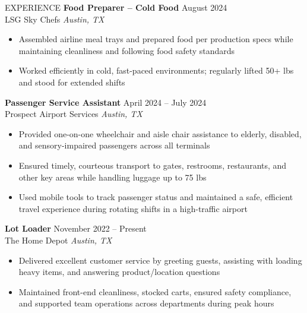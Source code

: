 \documentclass{resume} %
\begin{document}
\begin{rSection}{EXPERIENCE}
    \textbf{Food Preparer – Cold Food} \hfill August 2024 \\
    LSG Sky Chefs \hfill \textit{Austin, TX}
    \begin{itemize}
        \itemsep -3pt {} 
        \item Assembled airline meal trays and prepared food per production specs while maintaining cleanliness and following food safety standards
        \item Worked efficiently in cold, fast-paced environments; regularly lifted 50+ lbs and stood for extended shifts
    \end{itemize}
    
    \textbf{Passenger Service Assistant} \hfill April 2024 – July 2024 \\
    Prospect Airport Services \hfill \textit{Austin, TX}
    \begin{itemize}
        \itemsep -3pt {} 
        \item Provided one-on-one wheelchair and aisle chair assistance to elderly, disabled, and sensory-impaired passengers across all terminals
        \item Ensured timely, courteous transport to gates, restrooms, restaurants, and other key areas while handling luggage up to 75 lbs
        \item Used mobile tools to track passenger status and maintained a safe, efficient travel experience during rotating shifts in a high-traffic airport
    \end{itemize}

    \textbf{Lot Loader} \hfill November 2022 – Present \\
    The Home Depot \hfill \textit{Austin, TX}
    \begin{itemize}
        \itemsep -3pt {} 
        \item Delivered excellent customer service by greeting guests, assisting with loading heavy items, and answering product/location questions
        \item Maintained front-end cleanliness, stocked carts, ensured safety compliance, and supported team operations across departments during peak hours
    \end{itemize}


\end{rSection}
\end{document}
